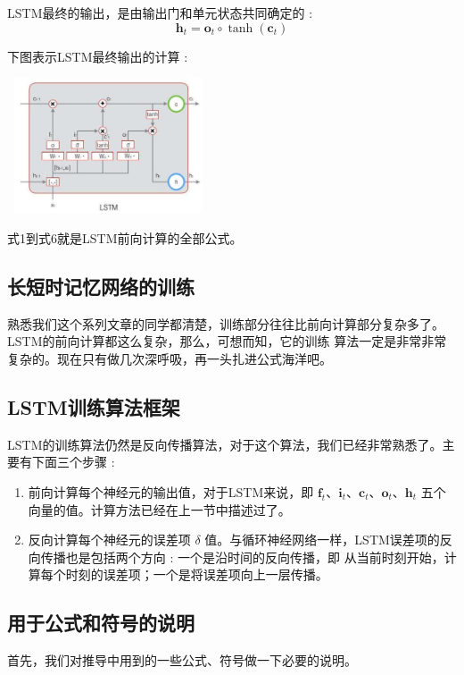 \documentclass[10.5pt,compsoc]{CjC}
\theoremstyle{mystyle}
\begin{document}
LSTM最终的输出，是由输出门和单元状态共同确定的 :
$$
\mathbf{h}_{t}=\mathbf{o}_{t} \circ \tanh \left(\mathbf{c}_{t}\right)
$$

下图表示LSTM最终输出的计算 :

\includegraphics[width=6cm, height=4cm]{images/2022_05_03_e4231fc9c1842f38b0acg-05(1)}

式1到式6就是LSTM前向计算的全部公式。\\

{\heiti \subsection{长短时记忆网络的训练} }
熟悉我们这个系列文章的同学都清楚，训练部分往往比前向计算部分复杂多了。LSTM的前向计算都这么复杂，那么，可想而知，它的训练 算法一定是非常非常复杂的。现在只有做几次深呼吸，再一头扎进公式海洋吧。\\

{\heiti \subsection{LSTM训练算法框架} }
LSTM的训练算法仍然是反向传播算法，对于这个算法，我们已经非常熟悉了。主要有下面三个步骤 :

\begin{enumerate}
  \item 前向计算每个神经元的输出值，对于LSTM来说，即 $\mathbf{f}_{t} 、 \mathbf{i}_{t} 、 \mathbf{c}_{t} 、 \mathbf{o}_{t} 、 \mathbf{h}_{t}$ 五个向量的值。计算方法已经在上一节中描述过了。

  \item 反向计算每个神经元的误差项 $\delta$ 值。与循环神经网络一样，LSTM误差项的反向传播也是包括两个方向 : 一个是沿时间的反向传播，即 从当前时刻开始，计算每个时刻的误差项；一个是将误差项向上一层传播。

\end{enumerate}
{\heiti \subsection{用于公式和符号的说明} }
首先，我们对推导中用到的一些公式、符号做一下必要的说明。
\end{document}
